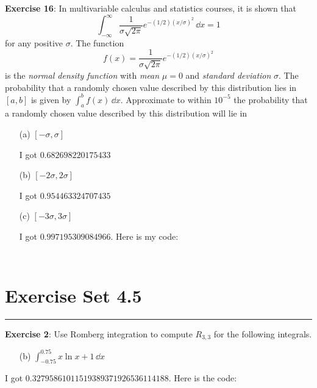 \documentclass{article}
\begin{document}
\textbf{Exercise 16}: In multivariable calculus and statistics courses, it is shown that
    \begin{equation*}
        \int_{-\infty}^{\infty} \dfrac{1}{\sigma\sqrt{2\pi}}e^{-(1 / 2)(x / \sigma)^{2}} \, \dd{x} = 1
    \end{equation*}
for any positive $\sigma$. The function
    \begin{equation*}
        f(x) = \dfrac{1}{\sigma\sqrt{2\pi}}e^{-(1 / 2)(x / \sigma)^{2}}
    \end{equation*}
is the \textit{ normal density function} with \textit{mean} $\mu  = 0$ and \textit{standard deviation} $\sigma$. The probability that a randomly chosen value described by this distribution lies in $[a, b]$ is given by $\int_{a}^{b} f(x) \, \dd{x}$. Approximate to within $10^{-5}$ the probability that a randomly chosen value described by this distribution will lie in
    \begin{itemize}
        \item [(a)] $[-\sigma, \sigma]$
            \begin{answer}
                I got $0.682698220175433$
            \end{answer}

        \item [(b)] $[-2\sigma, 2\sigma]$
            \begin{answer}
                I got $0.954463324707435$
            \end{answer}

        \item [(c)] $[-3\sigma, 3\sigma]$
            \begin{answer}
                I got $0.997195309084966$. Here is my code:
                \inputminted{matlab}{./code/CompositeIntegration/CompositeSimpson.m}
                \inputminted{matlab}{./code/script5.m}
            \end{answer}
    \end{itemize}

\newpage
\section*{Exercise Set 4.5}
\hrule

\textbf{Exercise 2}: Use Romberg integration to compute $R_{3, 3}$ for the following integrals.
    \begin{itemize}
        \item [(b)] $\int_{-0.75}^{0.75} x \ln{x + 1} \, \dd{x}$
    \end{itemize}
    \begin{answer}
        I got $0.32795861011519389371926536114188$. Here is the code:
        \inputminted{matlab}{./code/CompositeIntegration/Romberg.m}
        \inputminted{matlab}{./code/script6.m}
    \end{answer}
\end{document}
